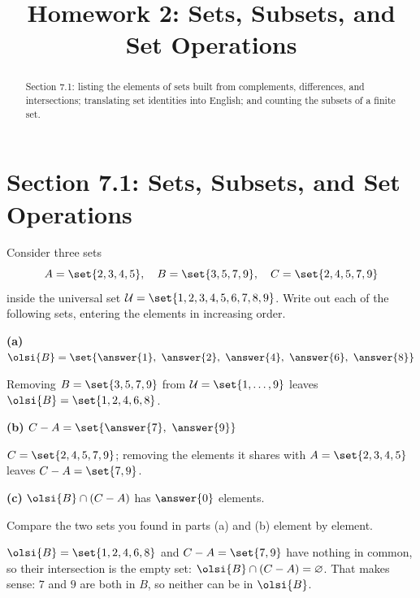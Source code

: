 \documentclass[12pt]{ximera}
\title{Homework 2: Sets, Subsets, and Set Operations}
\begin{document}
\begin{abstract}
Section 7.1: listing the elements of sets built from complements, differences, and
intersections; translating set identities into English; and counting the subsets of
a finite set.
\end{abstract}
\maketitle

\section*{Section 7.1: Sets, Subsets, and Set Operations}

\begin{problem}
Consider three sets
\[
A=\set{2,3,4,5}, \quad B=\set{3,5,7,9}, \quad C=\set{2,4,5,7,9}
\]
inside the universal set $\mathcal{U}=\set{1,2,3,4,5,6,7,8,9}$. Write out each of the
following sets, entering the elements in increasing order.

\begin{prompt}
\textbf{(a)} $\olsi{B} = \set{\answer{1},\ \answer{2},\ \answer{4},\ \answer{6},\ \answer{8}}$

\begin{feedback}
Removing $B=\set{3,5,7,9}$ from $\mathcal{U}=\set{1,\ldots,9}$ leaves
$\olsi{B}=\set{1,2,4,6,8}$.
\end{feedback}
\end{prompt}

\begin{prompt}
\textbf{(b)} $C - A = \set{\answer{7},\ \answer{9}}$

\begin{feedback}
$C=\set{2,4,5,7,9}$; removing the elements it shares with $A=\set{2,3,4,5}$ leaves
$C-A=\set{7,9}$.
\end{feedback}
\end{prompt}

\begin{prompt}
\textbf{(c)} $\olsi{B}\cap\left(C - A\right)$ has $\answer{0}$ elements.

\begin{multipleChoice}
\end{multipleChoice}

\begin{hint}
Compare the two sets you found in parts (a) and (b) element by element.
\end{hint}

\begin{feedback}
$\olsi{B}=\set{1,2,4,6,8}$ and $C-A=\set{7,9}$ have nothing in common, so their
intersection is the empty set: $\olsi{B}\cap(C-A)=\varnothing$. That makes sense:
$7$ and $9$ are both in $B$, so neither can be in $\olsi{B}$.
\end{feedback}
\end{prompt}
\end{problem}
\end{document}
